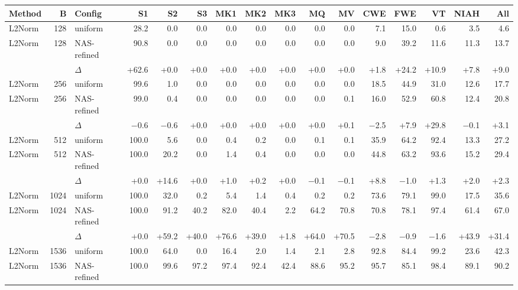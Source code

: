 \begin{table}[t]
  \centering
  \scriptsize
  \setlength{\tabcolsep}{2.5pt}
  \begin{tabular}{@{}l r l r r r r r r r r r r r r r @{}}
    \toprule
    Method & B & Config & S1 & S2 & S3 & MK1 & MK2 & MK3 & MQ & MV & CWE & FWE & VT & NIAH & All \\
    \midrule
    L2Norm & 128 & uniform & 28.2 & 0.0 & 0.0 & 0.0 & 0.0 & 0.0 & 0.0 & 0.0 & 7.1 & 15.0 & 0.6 & 3.5 & 4.6 \\
    L2Norm & 128 & NAS-refined & 90.8 & 0.0 & 0.0 & 0.0 & 0.0 & 0.0 & 0.0 & 0.0 & 9.0 & 39.2 & 11.6 & 11.3 & 13.7 \\
     &  & $\Delta$ & +62.6 & +0.0 & +0.0 & +0.0 & +0.0 & +0.0 & +0.0 & +0.0 & +1.8 & +24.2 & +10.9 & +7.8 & +9.0 \\
    \midrule
    L2Norm & 256 & uniform & 99.6 & 1.0 & 0.0 & 0.0 & 0.0 & 0.0 & 0.0 & 0.0 & 18.5 & 44.9 & 31.0 & 12.6 & 17.7 \\
    L2Norm & 256 & NAS-refined & 99.0 & 0.4 & 0.0 & 0.0 & 0.0 & 0.0 & 0.0 & 0.1 & 16.0 & 52.9 & 60.8 & 12.4 & 20.8 \\
     &  & $\Delta$ & $-$0.6 & $-$0.6 & +0.0 & +0.0 & +0.0 & +0.0 & +0.0 & +0.1 & $-$2.5 & +7.9 & +29.8 & $-$0.1 & +3.1 \\
    \midrule
    L2Norm & 512 & uniform & 100.0 & 5.6 & 0.0 & 0.4 & 0.2 & 0.0 & 0.1 & 0.1 & 35.9 & 64.2 & 92.4 & 13.3 & 27.2 \\
    L2Norm & 512 & NAS-refined & 100.0 & 20.2 & 0.0 & 1.4 & 0.4 & 0.0 & 0.0 & 0.0 & 44.8 & 63.2 & 93.6 & 15.2 & 29.4 \\
     &  & $\Delta$ & +0.0 & +14.6 & +0.0 & +1.0 & +0.2 & +0.0 & $-$0.1 & $-$0.1 & +8.8 & $-$1.0 & +1.3 & +2.0 & +2.3 \\
    \midrule
    L2Norm & 1024 & uniform & 100.0 & 32.0 & 0.2 & 5.4 & 1.4 & 0.4 & 0.2 & 0.2 & 73.6 & 79.1 & 99.0 & 17.5 & 35.6 \\
    L2Norm & 1024 & NAS-refined & 100.0 & 91.2 & 40.2 & 82.0 & 40.4 & 2.2 & 64.2 & 70.8 & 70.8 & 78.1 & 97.4 & 61.4 & 67.0 \\
     &  & $\Delta$ & +0.0 & +59.2 & +40.0 & +76.6 & +39.0 & +1.8 & +64.0 & +70.5 & $-$2.8 & $-$0.9 & $-$1.6 & +43.9 & +31.4 \\
    \midrule
    L2Norm & 1536 & uniform & 100.0 & 64.0 & 0.0 & 16.4 & 2.0 & 1.4 & 2.1 & 2.8 & 92.8 & 84.4 & 99.2 & 23.6 & 42.3 \\
    L2Norm & 1536 & NAS-refined & 100.0 & 99.6 & 97.2 & 97.4 & 92.4 & 42.4 & 88.6 & 95.2 & 95.7 & 85.1 & 98.4 & 89.1 & 90.2 \\

\end{tabular}
\end{table}
